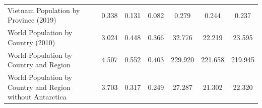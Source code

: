 \begin{tabular}{lccc|ccc}
                    Vietnam Population by Province (2019) &         0.338 &         0.131 &            0.082 &                                    0.279 &                                    0.244 &                                       0.237 \\
                       World Population by Country (2010) &         3.024 &         0.448 &            0.366 &                                   32.776 &                                   22.219 &                                      23.595 \\
                   World Population by Country and Region &         4.507 &         0.552 &            0.403 &                                  229.920 &                                  221.658 &                                     219.945 \\
World Population by Country and Region without Antarctica &         3.703 &         0.317 &            0.249 &                                   27.287 &                                   21.302 &                                      22.320 \\
\bottomrule
\end{tabular}
